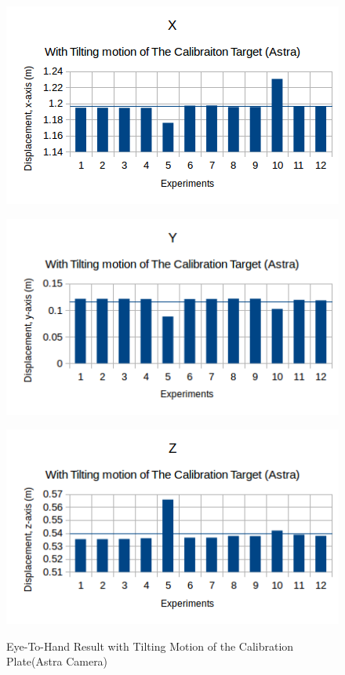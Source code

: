 \begin{figure}[htp]
\begin{center}
{
  \includegraphics[clip,width=0.5\columnwidth]{figures/tiltingorientation_astra_x.png}%
}
\end{center}
\begin{center}
{
  \includegraphics[clip,width=0.5\columnwidth]{figures/tiltingorientation_astra_y.png}%
}
\end{center}

\begin{center}
{
  \includegraphics[clip,width=0.5\columnwidth]{figures/tiltingorientation_astra_z.png}%
}
\end{center}
\caption{Eye-To-Hand Result with Tilting Motion of the Calibration Plate(Astra Camera)}
\end{figure}




